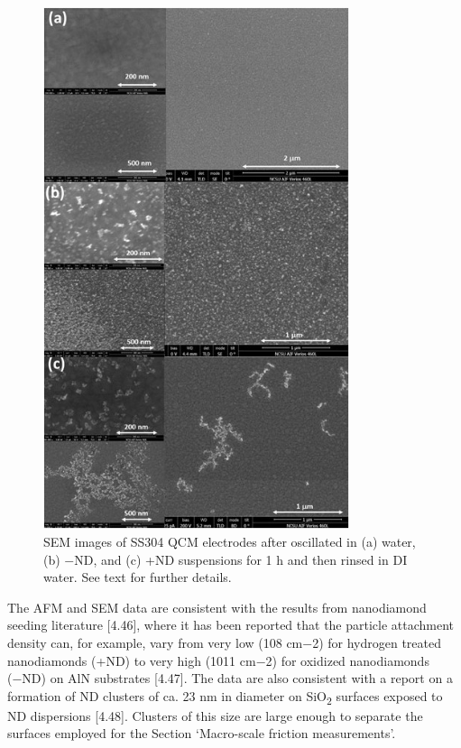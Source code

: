 \begin{figure}[hbtp]
	\centering
	\includegraphics[width=0.8\textwidth]{Chapter-4/fig5_png}
	\caption{SEM images of SS304 QCM electrodes after oscillated in (a) water, (b) $−$ND, and (c) +ND suspensions for 1 h and then rinsed in DI water. See text for further details.}
	\label{fig5:AFM images}
\end{figure} 

The AFM and SEM data are consistent with the results from nanodiamond seeding literature [4.46], where it has been reported that the particle attachment density can, for example, vary from very low (108 cm−2) for hydrogen treated nanodiamonds (+ND) to very high (1011 cm−2) for oxidized nanodiamonds (−ND) on AlN substrates [4.47]. The data are also consistent with a report on a formation of ND clusters of ca. 23 nm in diameter on SiO\textsubscript{2} surfaces exposed to ND dispersions [4.48]. Clusters of this size are large enough to separate the surfaces employed for the Section ‘Macro-scale friction measurements’.

